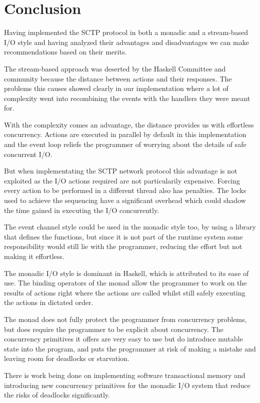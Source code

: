 \chapter{Conclusion}
Having implemented the SCTP protocol in both a monadic and a stream-based I/O style and having analyzed their advantages and disadvantages we can make recommendations based on their merits.

The stream-based approach was deserted by the Haskell Committee and community because the distance between actions and their responses. The problems this causes showed clearly in our implementation where a lot of complexity went into recombining the events with the handlers they were meant for. 

With the complexity comes an advantage, the distance provides us with effortless concurrency. Actions are executed in parallel by default in this implementation and the event loop reliefs the programmer of worrying about the details of safe concurrent I/O. 

But when implementating the SCTP network protocol this advantage is not exploited as the I/O actions required are not particularily expensive.
Forcing every action to be performed in a different thread also has penalties. The locks used to achieve the sequencing have a significant overhead which could shadow the time gained in executing the I/O concurrently.

The event channel style could be used in the monadic style too, by using a library that defines the functions, but since it is not part of the runtime system some responsibility would still lie with the programmer, reducing the effort but not making it effortless.

The monadic I/O style is dominant in Haskell, which is attributed to its ease of use. The binding operators of the monad allow the programmer to work on the results of actions right where the actions are called whilst still safely executing the actions in dictated order.

The monad does not fully protect the programmer from concurrency problems, but does require the programmer to be explicit about concurrency.
	The concurrency primitives it offers are very easy to use but do introduce mutable state into the program, and puts the programmer at risk of making a mistake and leaving room for deadlocks or starvation.

There is work being done on implementing software transactional memory and introducing new concurrency primitives for the monadic I/O system that reduce the risks of deadlocks significantly.

